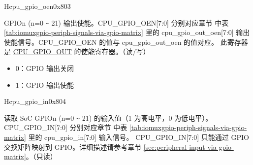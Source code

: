 \begin{register}{H}{cpu\_gpio\_oen}{0x803}\label{regdesc:GPIO_OEN}
%
%
%
%
%
%
%
%
%
\regnewline%
\begin{regdesc}\begin{reglist}
\label{fielddesc:GPIO_OEN}\item [CPU\_GPIO\_OEN] GPIOn (n=0 \verb+~+ 21) 输出使能。CPU\_GPIO\_OEN[7:0] 分别对应章节 \textit{} 中表 \ref{tab:iomuxgpio-periph-signals-via-gpio-matrix} 里的 cpu\_gpio\_out\_oen[7:0] 输出使能信号。CPU\_GPIO\_OEN 的值与 cpu\_gpio\_out\_oen 的值对应。
\newline 此寄存器是 \hyperref[fielddesc:GPIO_OUT]{CPU\_GPIO\_OUT} 的使能寄存器。（读/写）

\begin{itemize}
    \setlength\itemsep{-1em}
    \item 0：GPIO 输出关闭
    \item 1：GPIO 输出使能
\end{itemize}
\end{reglist}\end{regdesc}
\end{register}

\begin{register}{H}{cpu\_gpio\_in}{0x804}\label{regdesc:GPIO_IN}
%
%
%
%
%
%
%
%
%
\regnewline%
\begin{regdesc}\begin{reglist}
\label{fielddesc:GPIO_IN}\item [CPU\_GPIO\_IN] 读取 SoC GPIOn (n=0 \verb+~+ 21) 的输入值（1 为高电平，0 为低电平）。
\newline CPU\_GPIO\_IN[7:0] 分别对应章节 \textit{} 中表 \ref{tab:iomuxgpio-periph-signals-via-gpio-matrix} 里的 cpu\_gpio\_in[7:0] 输入信号。
\newline CPU\_GPIO\_IN[7:0] 只能通过 GPIO 交换矩阵映射到 GPIO。详细描述请参考章节 \ref{sec:peripheral-input-via-gpio-matrix}。（只读）
\end{reglist}\end{regdesc}
\end{register}


